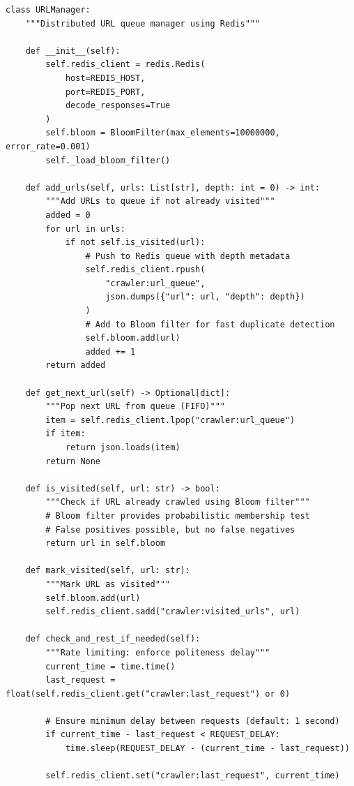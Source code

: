 \begin{lstlisting}
class URLManager:
    """Distributed URL queue manager using Redis"""
    
    def __init__(self):
        self.redis_client = redis.Redis(
            host=REDIS_HOST,
            port=REDIS_PORT,
            decode_responses=True
        )
        self.bloom = BloomFilter(max_elements=10000000, error_rate=0.001)
        self._load_bloom_filter()
    
    def add_urls(self, urls: List[str], depth: int = 0) -> int:
        """Add URLs to queue if not already visited"""
        added = 0
        for url in urls:
            if not self.is_visited(url):
                # Push to Redis queue with depth metadata
                self.redis_client.rpush(
                    "crawler:url_queue",
                    json.dumps({"url": url, "depth": depth})
                )
                # Add to Bloom filter for fast duplicate detection
                self.bloom.add(url)
                added += 1
        return added
    
    def get_next_url(self) -> Optional[dict]:
        """Pop next URL from queue (FIFO)"""
        item = self.redis_client.lpop("crawler:url_queue")
        if item:
            return json.loads(item)
        return None
    
    def is_visited(self, url: str) -> bool:
        """Check if URL already crawled using Bloom filter"""
        # Bloom filter provides probabilistic membership test
        # False positives possible, but no false negatives
        return url in self.bloom
    
    def mark_visited(self, url: str):
        """Mark URL as visited"""
        self.bloom.add(url)
        self.redis_client.sadd("crawler:visited_urls", url)
    
    def check_and_rest_if_needed(self):
        """Rate limiting: enforce politeness delay"""
        current_time = time.time()
        last_request = float(self.redis_client.get("crawler:last_request") or 0)
        
        # Ensure minimum delay between requests (default: 1 second)
        if current_time - last_request < REQUEST_DELAY:
            time.sleep(REQUEST_DELAY - (current_time - last_request))
        
        self.redis_client.set("crawler:last_request", current_time)
\end{lstlisting}

